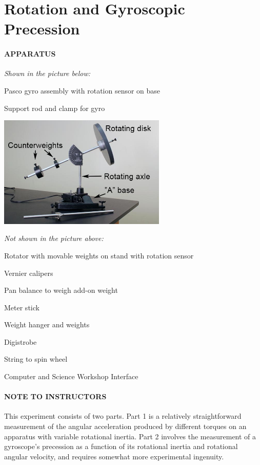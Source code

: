 
\vspace{-5ex}\part*{Rotation and Gyroscopic Precession}

\subsection*{APPARATUS}

\noindent\textit{Shown in the picture below:}
\squishlist
\item Pasco gyro assembly with rotation sensor on base
\item Support rod and clamp for gyro
\squishend
\begin{center} \includegraphics*[width=0.6\textwidth]{imgs/6labs/6Alab/6Aexp7/6A-EXP7_fig3text_scaled_fix_pdf.jpg} \end{center}
\noindent\textit{Not shown in the picture above:}
\squishlist
\item Rotator with movable weights on stand with rotation sensor
\item Vernier calipers
\item Pan balance to weigh add-on weight
\item Meter stick
\item Weight hanger and weights
\item Digistrobe
\item String to spin wheel
\item Computer and Science Workshop Interface
\squishend

\subsection*{NOTE TO INSTRUCTORS}

This experiment consists of two parts.  Part 1 is a relatively straightforward measurement of the angular acceleration produced by different torques on an apparatus with variable rotational inertia.  Part 2 involves the measurement of a gyroscope's precession as a function of its rotational inertia and rotational angular velocity, and requires somewhat more experimental ingenuity.

